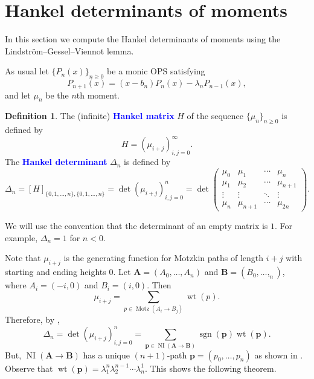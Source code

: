 \documentclass[oneside]{book}
\numberwithin{equation}{section}
\theoremstyle{definition}
\newtheorem{defn}[thm]{Definition}
\newcommand\NI{\operatorname{NI}}
\newcommand\Motz{\operatorname{Motz}}
\newcommand\sgn{\operatorname{sgn}}
\newcommand\wt{\operatorname{wt}}
\renewcommand\vec[1]{\bm{#1}}
\renewcommand\emph[1]{\textcolor{blue}{\bf #1}}
\begin{document}
\section{Hankel determinants of moments}

In this section we compute the Hankel determinants of moments using
the Lindstr\"om--Gessel--Viennot lemma.

As usual let \( \{ P_n(x) \}_{n\ge 0} \) be a monic OPS
satisfying
\[
  P_{n+1}(x) = (x-b_n) P_n(x) - \lambda_n P_{n-1}(x),
\]
and let \( \mu_n \) be the \( n \)th moment.


\begin{defn}\label{def:7}
  The (infinite) \emph{Hankel matrix} \( H \) of the sequence
  \( \{ \mu_n\}_{n\ge 0} \) is defined by
  \[
    H = \left( \mu_{i+j} \right)_{i,j=0}^\infty.
  \]
  The \emph{Hankel determinant} \( \Delta_n \) is defined by
\[
  \Delta_n = [H]_{\{0,1,\dots,n\},\{0,1,\dots,n\}} = \det \left(
    \mu_{i+j} \right)_{i,j=0}^n = \det
 \begin{pmatrix}
   \mu_0 & \mu_1 & \cdots & \mu_n\\
   \mu_1 & \mu_2 & \cdots & \mu_{n+1}\\
   \vdots & \vdots & \ddots & \vdots\\
   \mu_n & \mu_{n+1} & \cdots & \mu_{2n}
 \end{pmatrix}.
\]
\end{defn}

We will use the convention that the determinant of an empty matrix is
\( 1 \). For example, \( \Delta_{n} = 1 \) for \( n<0 \).

Note that \( \mu_{i+j} \) is the generating function for Motzkin paths
of length \( i+j \) with starting and ending heights \( 0 \). Let
\( \vec A = (A_0,\dots,A_n) \) and \( \vec B = (B_0,\dots,_n) \),
where \( A_i = (-i,0) \) and \( B_i = (i,0) \). Then
\[
  \mu_{i+j} = \sum_{p\in \Motz(A_i\to B_j)} \wt(p).
\]
Therefore, by ,
\[
  \Delta_n = \det \left( \mu_{i+j} \right)_{i,j=0}^n = \sum_{\vec p
    \in \NI(\vec A \to \vec B)} \sgn(\vec p) \wt(\vec p).
\]
But, \( \NI(\vec A \to \vec B) \) has a unique \( (n+1) \)-path
\( \vec p = (p_0,\dots,p_n) \) as shown in .
Observe that \( \wt(\vec p) = \lambda_1^n \lambda_2^{n-1} \cdots \lambda_n^1 \).
This shows the following theorem.
\end{document}
